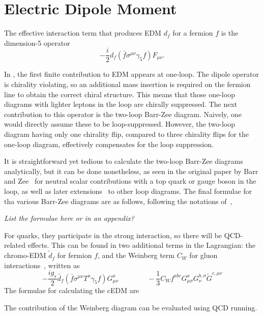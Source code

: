 \chapter{Electric Dipole Moment}
\label{ch:EDM}

The effective interaction term that produces EDM \(d_{f} \) for a fermion \(f \) is the dimension-5 operator
\begin{equation}
  -\frac{i}{2}d_{f}\left(\bar{f}\sigma^{\mu\nu}\gamma_{5}f\right)F_{\mu\nu}.
\end{equation}

In {\gthdm}, the first finite contribution to EDM appears at one-loop.
The dipole operator is chirality violating, so an additional mass insertion is required on the fermion line to obtain the correct chiral structure.
This means that those one-loop diagrams with lighter leptons in the loop are chirally suppressed.
The next contribution to this operator is the two-loop Barr-Zee diagram. 
Naively, one would directly assume these to be loop-suppressed. 
However, the two-loop diagram having only one chirality flip, compared to three chirality flips for the one-loop diagram, 
effectively compensates for the loop suppression.

It is straightforward yet tedious to calculate the two-loop Barr-Zee diagrams analytically, but it can be done nonetheless, 
as seen in the original paper by Barr and Zee~\cite{BarrZee} for neutral scalar contributions with a top quark or gauge boson in the loop,
as well as later extensions~\cite{MoreBarrZee} to other loop diagrams.
The final formulae for tha various Barr-Zee diagrams are as follows, following the notations of~\cite{Abe},

\textit{List the formulae here or in an appendix?}

For quarks, they participate in the strong interaction, so there will be QCD-related effects.
This can be found in two additional terms in the Lagrangian: 
the chromo-EDM \(\tilde{d}_{f} \) for fermion \(f \), and the Weinberg term \(C_{W} \) for gluon interactions~\cite{Weinberg89}, written as
\begin{equation}
  -\frac{i g_{s}}{2}\tilde{d_{f}}\left(\bar{f}\sigma^{\mu\nu}T^{a}\gamma_{5}f\right)G^{a}_{\mu\nu}\quad \qquad \quad -\frac{1}{3}C_Wf^{abc}G^{a}_{\mu\sigma}G^{b,\sigma}_{\nu}\tilde{G}^{c,\mu\nu}
\end{equation}
The formulae for calculating the cEDM are

The contribution of the Weinberg diagram can be evaluated using QCD running.
